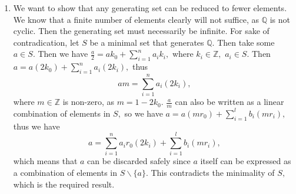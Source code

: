 \documentclass{article}
\begin{document}
\begin{enumerate}
	\item We want to show that any generating set can be reduced to fewer elements. We know that a finite number of elements clearly will not suffice, as 
	$\mathbb{Q}$ is not cyclic. Then the generating set must necessarily be infinite. For sake of contradication, let $S$ be a minimal set that generates 
	$\mathbb{Q}.$ Then take some $a \in S.$ Then we have $\frac{a}{2}=ak_0+\sum_{i=1}^{n}a_ik_i,$ where $k_i \in \mathbb{Z},$ $a_i \in S.$ Then 
	$a=a(2k_0)+\sum_{i=1}^{n}a_i(2k_i),$ thus $$am=\sum_{i=1}^na_i(2k_i),$$ where $m \in \mathbb{Z}$ is non-zero, as $m=1-2k_0$. $\frac{a}{m}$ can also be 
	written as a linear combination of elements in $S,$ so we have $a=a(mr_0)+\sum_{i=1}^{l}b_i(mr_i),$ thus we have $$a=\sum_{i=1}^{n}a_ir_0(2k_i)+ 
	\sum_{i=1}^{l}b_i(mr_i),$$ which means that $a$ can be discarded safely since $a$ itself can be expressed as a combination of elements in 
	$S\backslash\{a\}.$ This contradicts the minimality of $S,$ which is the required result.  
\end{enumerate}
\end{document}
